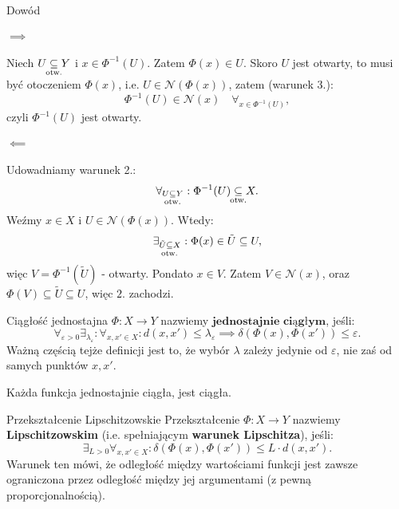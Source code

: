 \documentclass{article}
\newcounter{defi}
\numberwithin{defi}{section}
\numberwithin{defi}{section}
\newcommand{\Nau}{\mathcal{N}}
\newcommand{\subotw}{\underset{\clap{\scriptsize otw.}}{\subseteq}}
\providecommand{\eps}{\varepsilon}
\begin{document}
    \begin{dow}{Dowód}
        \paragraph{$\implies$} Niech $U \subotw Y$ i $x \in \Phi^{-1}(U)$. Zatem $\Phi(x) \in U$. Skoro $U$ jest otwarty, to musi być otoczeniem $\Phi(x)$, i.e. $U \in \Nau(\Phi(x))$, zatem (warunek 3.): \begin{equation*}
            \Phi^{-1}(U) \in \Nau(x) \quad \forall_{x \in \Phi^{-1}(U)},
        \end{equation*} czyli $\Phi^{-1}(U)$ jest otwarty.

        \paragraph{$\impliedby$} Udowadniamy warunek 2.:\begin{equation*}
            \forall_{U \subotw Y}: \Phi^{-1}(U) \subotw X.
        \end{equation*} Weźmy $x \in X$ i $U \in \Nau(\Phi(x))$. Wtedy: \begin{equation*}
            \exists_{\tilde{U} \subotw X}: \Phi(x) \in \tilde{U} \subseteq U,
        \end{equation*} więc $V = \Phi^{-1}(\tilde{U})$ - otwarty. Pondato $x \in V$. Zatem $V \in \Nau(x)$, oraz $\Phi(V) \subseteq \tilde{U} \subseteq U$, więc $2.$ zachodzi.
    \end{dow}


    \begin{defr} {Ciągłość jednostajna} \label{defr:ciaglosc-jednostajna}
        $\Phi: X \to Y$ nazwiemy $\textbf{jednostajnie ciągłym}$, jeśli: \begin{equation}
            \forall_{\eps > 0} \exists_{\lambda_\eps}: \forall_{x, x' \in X}: d(x, x') \leqslant \lambda_\eps \implies \delta(\Phi(x), \Phi(x')) \leqslant \eps.
        \end{equation}
        Ważną częścią tejże definicji jest to, że wybór $\lambda$ zależy jedynie od $\eps$, nie zaś od samych punktów $x, x'$.
    \end{defr} 

    \begin{obs}{}
        Każda funkcja jednostajnie ciągła, jest ciągła.
    \end{obs}

    \begin{defr}{Przekształcenie Lipschitzowskie}
        Przekształcenie $\Phi: X \to Y$ nazwiemy \textbf{Lipschitzowskim} (i.e. spełniającym \textbf{warunek Lipschitza}), jeśli:\begin{equation}
            \exists_{L > 0} \forall_{x, x' \in X}: \delta(\Phi(x), \Phi(x')) \leqslant L \cdot d(x, x').
        \end{equation} Warunek ten mówi, że odległość między wartościami funkcji jest zawsze ograniczona przez odległość między jej argumentami (z pewną proporcjonalnością).
    \end{defr}
\end{document}
